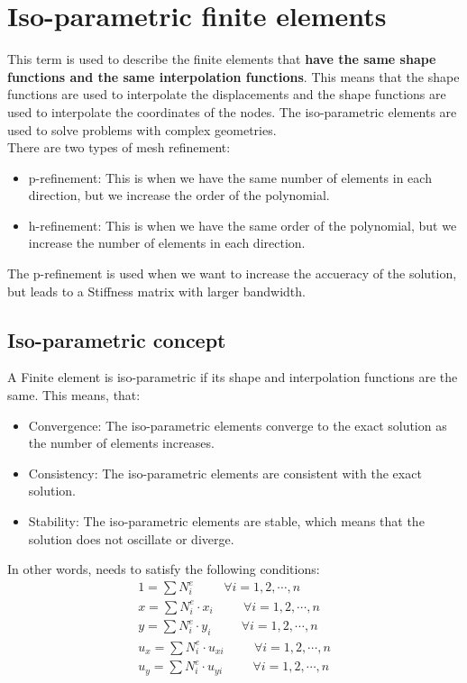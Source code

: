 \documentclass{article}  %
\begin{document}
\section{Iso-parametric finite elements}
This term is used to describe the finite elements that \textbf{have the same shape functions and the same interpolation functions}. This means that the shape functions are used to interpolate the displacements and the shape functions are used to interpolate the coordinates of the nodes. The iso-parametric elements are used to solve problems with complex geometries.\\
There are two types of mesh refinement:
\begin{itemize}
    \item p-refinement: This is when we have the same number of elements in each direction, but we increase the order of the polynomial.
    \item h-refinement: This is when we have the same order of the polynomial, but we increase the number of elements in each direction.
\end{itemize}

The p-refinement is used when we want to increase the accueracy of the solution, but leads to a Stiffness matrix with larger bandwidth.

\subsection{Iso-parametric concept}
A Finite element is iso-parametric if its shape and interpolation functions are the same. This means, that:
\begin{itemize}
  \item Convergence: The iso-parametric elements converge to the exact solution as the number of elements increases.
  \item Consistency: The iso-parametric elements are consistent with the exact solution.
  \item Stability: The iso-parametric elements are stable, which means that the solution does not oscillate or diverge.
\end{itemize}

In other words, needs to satisfy the following conditions:
\begin{align}
  1=\sum N_i^e \hspace{1cm} \forall i=1,2,\cdots,n \\
  x= \sum N_i^e \cdot x_i \hspace{1cm} \forall i=1,2,\cdots,n \\
  y= \sum N_i^e \cdot y_i \hspace{1cm} \forall i=1,2,\cdots,n \\
  u_x= \sum N_i^e \cdot u_{xi} \hspace{1cm} \forall i=1,2,\cdots,n \\
  u_y= \sum N_i^e \cdot u_{yi} \hspace{1cm} \forall i=1,2,\cdots,n \\
\end{align}
\newpage
\end{document}
